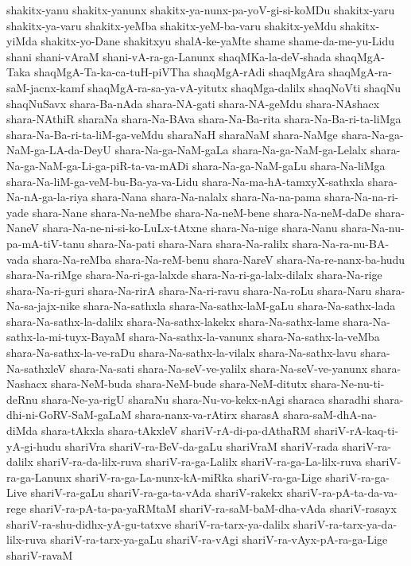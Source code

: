 {shakitx-yanu
shakitx-yanunx
shakitx-ya-nunx-pa-yoV-gi-si-koMDu
shakitx-yaru
shakitx-ya-varu
shakitx-yeMba
shakitx-yeM-ba-varu
shakitx-yeMdu
shakitx-yiMda
shakitx-yo-Dane
shakitxyu
shalA-ke-yaMte
shame
shame-da-me-yu-Lidu
shani
shani-vAraM
shani-vA-ra-ga-Lanunx
shaqMKa-la-deV-shada
shaqMgA-Taka
shaqMgA-Ta-ka-ca-tuH-piVTha
shaqMgA-rAdi
shaqMgAra
shaqMgA-ra-saM-jacnx-kamf
shaqMgA-ra-sa-ya-vA-yitutx
shaqMga-dalilx
shaqNoVti
shaqNu
shaqNuSavx
shara-Ba-nAda
shara-NA-gati
shara-NA-geMdu
shara-NAshacx
shara-NAthiR
sharaNa
shara-Na-BAva
shara-Na-Ba-rita
shara-Na-Ba-ri-ta-liMga
shara-Na-Ba-ri-ta-liM-ga-veMdu
sharaNaH
sharaNaM
shara-NaMge
shara-Na-ga-NaM-ga-LA-da-DeyU
shara-Na-ga-NaM-gaLa
shara-Na-ga-NaM-ga-Lelalx
shara-Na-ga-NaM-ga-Li-ga-piR-ta-va-mADi
shara-Na-ga-NaM-gaLu
shara-Na-liMga
shara-Na-liM-ga-veM-bu-Ba-ya-va-Lidu
shara-Na-ma-hA-tamxyX-sathxla
shara-Na-nA-ga-la-riya
shara-Nana
shara-Na-nalalx
shara-Na-na-pama
shara-Na-na-ri-yade
shara-Nane
shara-Na-neMbe
shara-Na-neM-bene
shara-Na-neM-daDe
shara-NaneV
shara-Na-ne-ni-si-ko-LuLx-tAtxne
shara-Na-nige
shara-Nanu
shara-Na-nu-pa-mA-tiV-tanu
shara-Na-pati
shara-Nara
shara-Na-ralilx
shara-Na-ra-nu-BA-vada
shara-Na-reMba
shara-Na-reM-benu
shara-NareV
shara-Na-re-nanx-ba-hudu
shara-Na-riMge
shara-Na-ri-ga-lalxde
shara-Na-ri-ga-lalx-dilalx
shara-Na-rige
shara-Na-ri-guri
shara-Na-rirA
shara-Na-ri-ravu
shara-Na-roLu
shara-Naru
shara-Na-sa-jajx-nike
shara-Na-sathxla
shara-Na-sathx-laM-gaLu
shara-Na-sathx-lada
shara-Na-sathx-la-dalilx
shara-Na-sathx-lakekx
shara-Na-sathx-lame
shara-Na-sathx-la-mi-tuyx-BayaM
shara-Na-sathx-la-vanunx
shara-Na-sathx-la-veMba
shara-Na-sathx-la-ve-raDu
shara-Na-sathx-la-vilalx
shara-Na-sathx-lavu
shara-Na-sathxleV
shara-Na-sati
shara-Na-seV-ve-yalilx
shara-Na-seV-ve-yanunx
shara-Nashacx
shara-NeM-buda
shara-NeM-bude
shara-NeM-ditutx
shara-Ne-nu-ti-deRnu
shara-Ne-ya-rigU
sharaNu
shara-Nu-vo-kekx-nAgi
sharaca
sharadhi
shara-dhi-ni-GoRV-SaM-gaLaM
shara-nanx-va-rAtirx
sharasA
shara-saM-dhA-na-diMda
shara-tAkxla
shara-tAkxleV
shariV-rA-di-pa-dAthaRM
shariV-rA-kaq-ti-yA-gi-hudu
shariVra
shariV-ra-BeV-da-gaLu
shariVraM
shariV-rada
shariV-ra-dalilx
shariV-ra-da-lilx-ruva
shariV-ra-ga-Lalilx
shariV-ra-ga-La-lilx-ruva
shariV-ra-ga-Lanunx
shariV-ra-ga-La-nunx-kA-miRka
shariV-ra-ga-Lige
shariV-ra-ga-Live
shariV-ra-gaLu
shariV-ra-ga-ta-vAda
shariV-rakekx
shariV-ra-pA-ta-da-va-rege
shariV-ra-pA-ta-pa-yaRMtaM
shariV-ra-saM-baM-dha-vAda
shariV-rasayx
shariV-ra-shu-didhx-yA-gu-tatxve
shariV-ra-tarx-ya-dalilx
shariV-ra-tarx-ya-da-lilx-ruva
shariV-ra-tarx-ya-gaLu
shariV-ra-vAgi
shariV-ra-vAyx-pA-ra-ga-Lige
shariV-ravaM
}

